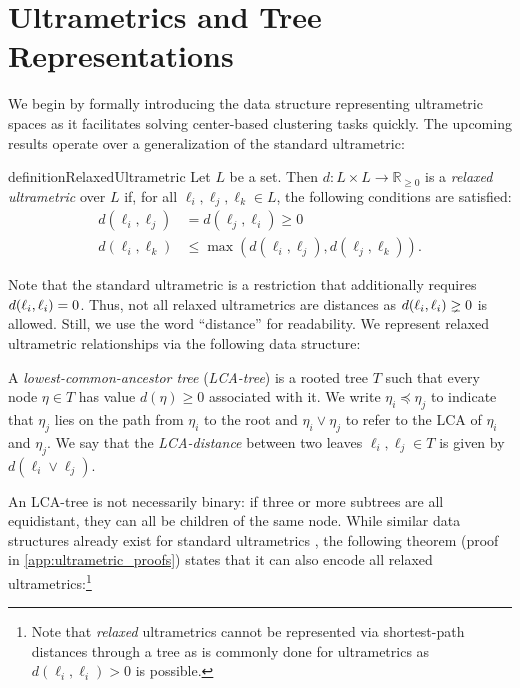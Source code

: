 \section{Ultrametrics and Tree Representations}
\label{sec:ultrametrics}

We begin by formally introducing the data structure representing ultrametric spaces as it facilitates solving center-based clustering tasks quickly. The upcoming results operate over a generalization of the standard ultrametric:
\begin{restatable}{definition}{RelaxedUltrametric}
    \label{def:relaxed_ultrametric}
    Let $L$ be a set. Then $d: L \times L \rightarrow \mathbb{R}_{\geq 0}$ is a \emph{relaxed ultrametric} over $L$ if, for all $\ell_i, \ell_j, \ell_k \in L$, the
    following conditions are satisfied:
    \begin{align*}
        d(\ell_i, \ell_j) &= d(\ell_j, \ell_i) \geq 0 \\
        d(\ell_i, \ell_k) &\leq \max( d(\ell_i, \ell_j), d(\ell_j, \ell_k)).
    \end{align*}
\end{restatable}
Note that the standard ultrametric is a restriction that additionally requires $d(\ell_i, \ell_i) = 0$. Thus, not all relaxed ultrametrics are distances as $d(\ell_i, \ell_i) \gneq 0$ is allowed. Still, we use the word ``distance'' for readability.
%
We represent relaxed ultrametric relationships via the following data structure:

\begin{definition}
    \label{def:lca_tree}
    A \emph{lowest-common-ancestor tree} (\emph{LCA-tree}) is a rooted tree $T$ such that every node $\eta \in T$ has value $d(\eta) \geq 0$ associated with it. We write $\eta_i \preceq \eta_j$ to indicate that $\eta_j$ lies on the path from $\eta_i$ to the root and $\eta_i \lor \eta_j$ to refer to the LCA of $\eta_i$ and $\eta_j$. We say that the \emph{LCA-distance} between two leaves $\ell_i, \ell_j \in T$ is given by $d(\ell_i \lor \ell_j)$.
\end{definition}

An LCA-tree is not necessarily binary: if three or more subtrees are all equidistant, they can all be children of the same node. While similar data structures already exist for standard ultrametrics \citep{ultrametric_lca_def, memory_efficient_minimax}, the following theorem (proof in \ref{app:ultrametric_proofs}) states that it can also encode all relaxed ultrametrics:\footnote{
Note that \textit{relaxed} ultrametrics cannot be represented via shortest-path distances through a tree as is commonly done for ultrametrics \citep{ultrametrics_root_equidist} as $d(\ell_i, \ell_i) > 0$ is possible.}


